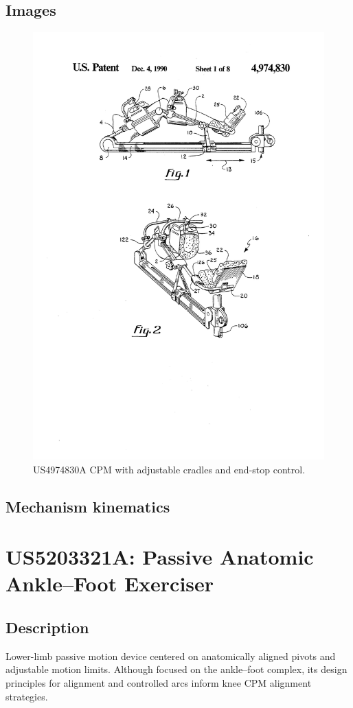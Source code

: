 \documentclass[11pt]{article}
\begin{document}
\subsection{Images}
\begin{figure}[H]
  \centering
  \includegraphics[width=0.54\linewidth]{US4974830_1.png}
  \caption{US4974830A CPM with adjustable cradles and end-stop control.}
  \label{fig:US4974830A}
\end{figure}

\subsection{Mechanism kinematics}

\section{US5203321A: Passive Anatomic Ankle–Foot Exerciser}
\subsection{Description}
Lower-limb passive motion device centered on anatomically aligned pivots and adjustable motion limits. Although focused on the ankle–foot complex, its design principles for alignment and controlled arcs inform knee CPM alignment strategies.
\end{document}
